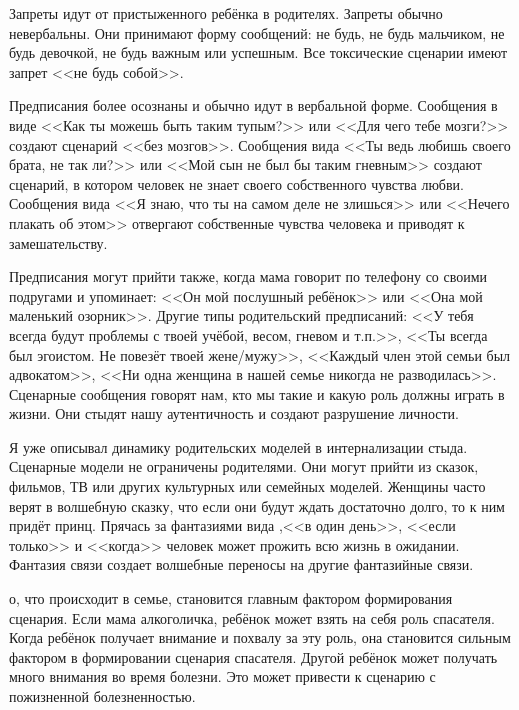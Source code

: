 \documentclass[10pt, fleqn]{article}
\begin{document}
Запреты идут от пристыженного ребёнка в родителях. Запреты обычно невербальны. Они принимают форму сообщений: не будь, не будь мальчиком, не будь девочкой, не будь важным или успешным. Все токсические сценарии имеют запрет <<не будь собой>>.



Предписания более осознаны и обычно идут в вербальной форме. Сообщения в виде <<Как ты можешь быть таким тупым?>> или <<Для чего тебе мозги?>> создают сценарий <<без мозгов>>. Сообщения вида <<Ты ведь любишь своего брата, не так ли?>> или <<Мой сын не был бы таким гневным>> создают сценарий, в котором человек не знает своего собственного чувства любви. Сообщения вида <<Я знаю, что ты на самом деле не злишься>> или <<Нечего плакать об этом>> отвергают собственные чувства человека и приводят к замешательству.


Предписания могут прийти также, когда мама говорит по телефону со своими подругами и упоминает: <<Он мой послушный ребёнок>> или <<Она мой маленький озорник>>. Другие типы родительский предписаний: <<У тебя всегда будут проблемы с твоей учёбой, весом, гневом и т.п.>>, <<Ты всегда был эгоистом. Не повезёт твоей жене/мужу>>, <<Каждый член этой семьи был адвокатом>>, <<Ни одна женщина в нашей семье никогда не разводилась>>. Сценарные сообщения говорят нам, кто мы такие и какую роль должны играть в жизни. Они стыдят нашу аутентичность и создают разрушение личности.


Я уже описывал динамику родительских моделей в интернализации стыда. Сценарные модели не ограничены родителями. Они могут прийти из сказок, фильмов, ТВ или других культурных или семейных моделей.
Женщины часто верят в волшебную сказку, что если они будут ждать достаточно долго, то к ним придёт принц.
Прячась за фантазиями вида ,<<в один день>>, <<если только>> и <<когда>> человек может прожить всю жизнь в ожидании. Фантазия связи создает волшебные переносы на другие фантазийные связи.



о, что происходит в семье, становится главным фактором формирования сценария. Если мама алкоголичка, ребёнок может взять на себя роль спасателя. Когда ребёнок получает внимание и похвалу за эту роль, она становится сильным фактором в формировании сценария спасателя. Другой ребёнок может получать много внимания во время болезни. Это может привести к сценарию с пожизненной болезненностью.

\end{document}
